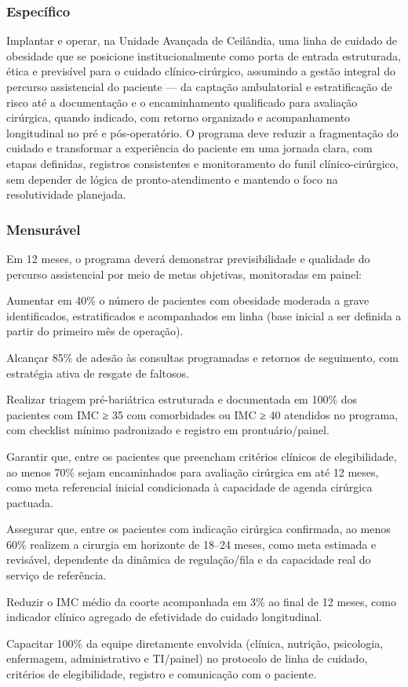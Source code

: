 \documentclass[12pt]{article}
\begin{document}
\subsubsection{Específico}
\label{sec:orge89ee84}
Implantar e operar, na Unidade Avançada de Ceilândia, uma linha de cuidado de obesidade que se posicione institucionalmente como porta de entrada estruturada, ética e previsível para o cuidado clínico-cirúrgico, assumindo a gestão integral do percurso assistencial do paciente — da captação ambulatorial e estratificação de risco até a documentação e o encaminhamento qualificado para avaliação cirúrgica, quando indicado, com retorno organizado e acompanhamento longitudinal no pré e pós-operatório. O programa deve reduzir a fragmentação do cuidado e transformar a experiência do paciente em uma jornada clara, com etapas definidas, registros consistentes e monitoramento do funil clínico-cirúrgico, sem depender de lógica de pronto-atendimento e mantendo o foco na resolutividade planejada.

\subsubsection{Mensurável}
\label{sec:org09322c1}
Em 12 meses, o programa deverá demonstrar previsibilidade e qualidade do percurso assistencial por meio de metas objetivas, monitoradas em painel:

\begin{hlevelthree}
\item Aumentar em 40\% o número de pacientes com obesidade moderada a grave identificados, estratificados e acompanhados em linha (base inicial a ser definida a partir do primeiro mês de operação).
\item Alcançar 85\% de adesão às consultas programadas e retornos de seguimento, com estratégia ativa de resgate de faltosos.
\item Realizar triagem pré-bariátrica estruturada e documentada em 100\% dos pacientes com IMC ≥ 35 com comorbidades ou IMC ≥ 40 atendidos no programa, com checklist mínimo padronizado e registro em prontuário/painel.
\item Garantir que, entre os pacientes que preencham critérios clínicos de elegibilidade, ao menos 70\% sejam encaminhados para avaliação cirúrgica em até 12 meses, como meta referencial inicial condicionada à capacidade de agenda cirúrgica pactuada.
\item Assegurar que, entre os pacientes com indicação cirúrgica confirmada, ao menos 60\% realizem a cirurgia em horizonte de 18–24 meses, como meta estimada e revisável, dependente da dinâmica de regulação/fila e da capacidade real do serviço de referência.
\item Reduzir o IMC médio da coorte acompanhada em 3\% ao final de 12 meses, como indicador clínico agregado de efetividade do cuidado longitudinal.
\item Capacitar 100\% da equipe diretamente envolvida (clínica, nutrição, psicologia, enfermagem, administrativo e TI/painel) no protocolo de linha de cuidado, critérios de elegibilidade, registro e comunicação com o paciente.
\end{hlevelthree}
\end{document}
